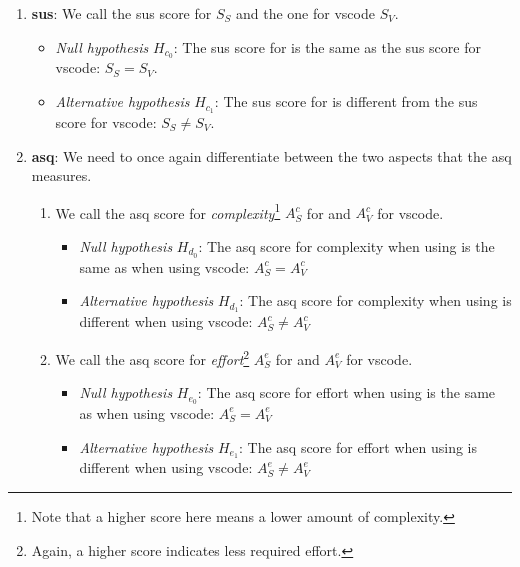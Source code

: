 \documentclass[../thesis]{subfiles}
\begin{document}
\begin{enumerate}[resume,label=\alph*)]
	\item \textbf{\gls{sus}}:
	      We call the \gls{sus} score for \SEE{} $S_S$ and the one for \gls{vscode} $S_V$.
	      \begin{itemize}
		      \item \emph{Null hypothesis} $H_{c_0}$:
		            The \gls{sus} score for \SEE{} is the same as the \gls{sus} score for \gls{vscode}: $S_S = S_V$.
		      \item \emph{Alternative hypothesis} $H_{c_1}$:
		            The \gls{sus} score for \SEE{} is different from the \gls{sus} score for \gls{vscode}: $S_S \neq S_V$.
	      \end{itemize}
	\item \textbf{\gls{asq}}:
	      We need to once again differentiate between the two aspects that the \gls{asq} measures.
	      \begin{enumerate}[label=\roman*)]
		      \item We call the \gls{asq} score for \emph{complexity}\footnote{
			            Note that a higher score here means a lower amount of complexity.
		            } $A^c_S$ for \SEE{} and $A^c_V$ for \gls{vscode}.
		            \begin{itemize}
			            \item \emph{Null hypothesis} $H_{d_0}$:
			                  The \gls{asq} score for complexity when using \SEE{} is the same as when using \gls{vscode}: $A^c_S = A^c_V$
			            \item \emph{Alternative hypothesis} $H_{d_1}$:
			                  The \gls{asq} score for complexity when using \SEE{} is different when using \gls{vscode}: $A^c_S \neq A^c_V$
		            \end{itemize}
		      \item We call the \gls{asq} score for \emph{effort}\footnote{
			            Again, a higher score indicates less required effort.
		            } $A^e_S$ for \SEE{} and $A^e_V$ for \gls{vscode}.
		            \begin{itemize}
			            \item \emph{Null hypothesis} $H_{e_0}$:
			                  The \gls{asq} score for effort when using \SEE{} is the same as when using \gls{vscode}: $A^e_S = A^e_V$
			            \item \emph{Alternative hypothesis} $H_{e_1}$:
			                  The \gls{asq} score for effort when using \SEE{} is different when using \gls{vscode}: $A^e_S \neq A^e_V$
		            \end{itemize}
	      \end{enumerate}
\end{enumerate}
\end{document}
